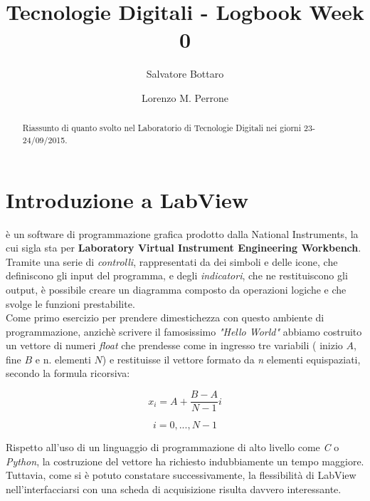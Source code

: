 \documentclass[journal, a4paper]{IEEEtran}
\begin{document}
	\title{Tecnologie Digitali - Logbook Week 0}
	\author[1]{Salvatore Bottaro}
	\author[2]{Lorenzo M. Perrone}
	\maketitle

\begin{abstract}
	Riassunto di quanto svolto nel Laboratorio di Tecnologie Digitali nei giorni 23-24/09/2015.
\end{abstract}

\section{Introduzione a LabView}
	 è un software di programmazione grafica prodotto dalla National Instruments, la cui sigla sta per \textbf{Laboratory Virtual Instrument Engineering Workbench}. Tramite una serie di \textit{controlli}, rappresentati da dei simboli e delle icone, che definiscono gli input del programma, e degli \textit{indicatori}, che ne restituiscono gli output, è possibile creare un diagramma composto da operazioni logiche e che svolge le funzioni prestabilite.\\
	Come primo esercizio per prendere dimestichezza con questo ambiente di programmazione, anzichè scrivere il famosissimo \textit{"Hello World"} abbiamo costruito un vettore di numeri \textit{float} che prendesse come in ingresso tre variabili ( inizio $A$, fine $B$ e n. elementi $N$) e restituisse il vettore formato da \textit{n} elementi equispaziati, secondo la formula ricorsiva:
	
	\begin{equation}
	x_i = A + \frac{B-A}{N-1}i
	\end{equation}  
	
	\begin{equation}
	i = 0,...,N-1
	\end{equation} 

	Rispetto all'uso di un linguaggio di programmazione di alto livello come \textit{C} o \textit{Python}, la costruzione del vettore ha richiesto indubbiamente un tempo maggiore. Tuttavia, come si è potuto constatare successivamente, la flessibilità di LabView nell'interfacciarsi con una scheda di acquisizione risulta davvero interessante. \\
	
\end{document}
